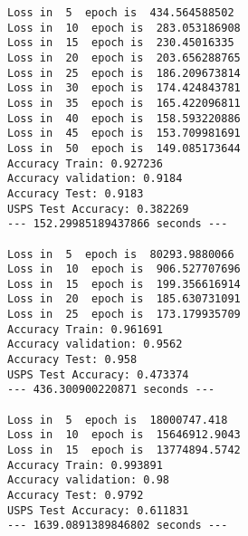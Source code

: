 \documentclass[a4paper,11pt]{article}
\begin{document}
\begin{lstlisting}[label={list:fifth},caption=Code output.]
Loss in  5  epoch is  434.564588502
Loss in  10  epoch is  283.053186908
Loss in  15  epoch is  230.45016335
Loss in  20  epoch is  203.656288765
Loss in  25  epoch is  186.209673814
Loss in  30  epoch is  174.424843781
Loss in  35  epoch is  165.422096811
Loss in  40  epoch is  158.593220886
Loss in  45  epoch is  153.709981691
Loss in  50  epoch is  149.085173644
Accuracy Train: 0.927236
Accuracy validation: 0.9184
Accuracy Test: 0.9183
USPS Test Accuracy: 0.382269
--- 152.29985189437866 seconds ---

Loss in  5  epoch is  80293.9880066
Loss in  10  epoch is  906.527707696
Loss in  15  epoch is  199.356616914
Loss in  20  epoch is  185.630731091
Loss in  25  epoch is  173.179935709
Accuracy Train: 0.961691
Accuracy validation: 0.9562
Accuracy Test: 0.958
USPS Test Accuracy: 0.473374
--- 436.300900220871 seconds ---

Loss in  5  epoch is  18000747.418
Loss in  10  epoch is  15646912.9043
Loss in  15  epoch is  13774894.5742
Accuracy Train: 0.993891
Accuracy validation: 0.98
Accuracy Test: 0.9792
USPS Test Accuracy: 0.611831
--- 1639.0891389846802 seconds ---

\end{lstlisting}
\end{document}
